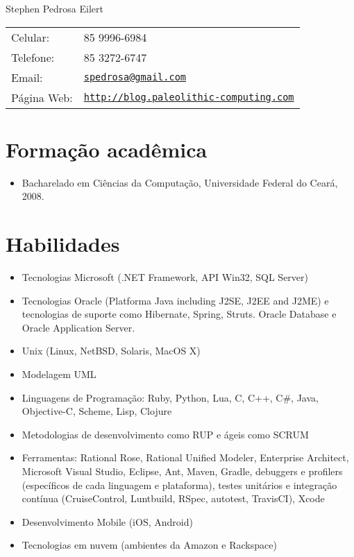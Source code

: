 \documentclass[letterpaper]{article}
\def\name{Stephen Pedrosa Eilert}
\begin{document}
\begin{flushright}

{\huge \name}


\vspace{0.25in}
\begin{minipage}{0.45\linewidth}
  \begin{tabular}{ll}
    Celular: & 85 9996-6984 \\
    Telefone: & 85 3272-6747 \\
    Email: & \href{mailto:spedrosa@gmail.com}{\tt spedrosa@gmail.com} \\
    Página Web: & \href{http://blog.paleolithic-computing.com}{\tt http://blog.paleolithic-computing.com} \\
  \end{tabular}
\end{minipage}
\end{flushright}

\section*{Formação acadêmica}

\begin{itemize}
  \item Bacharelado em Ciências da Computação, Universidade Federal do Ceará, 2008.
\end{itemize}

\section*{Habilidades}
\begin{itemize}
  \item Tecnologias Microsoft (.NET Framework, API Win32, SQL Server)
  \item Tecnologias Oracle (Platforma Java including J2SE, J2EE and J2ME) e tecnologias
    de suporte como Hibernate, Spring, Struts.
    Oracle Database e Oracle Application Server.
  \item Unix (Linux, NetBSD, Solaris, MacOS X)
  \item Modelagem UML
  \item Linguagens de Programação: Ruby, Python, Lua, C, C++, C\#, Java, Objective-C, Scheme, Lisp, Clojure
  \item Metodologias de desenvolvimento como RUP e ágeis como SCRUM
  \item Ferramentas: Rational Rose, Rational Unified Modeler, Enterprise Architect, Microsoft
Visual Studio, Eclipse, Ant, Maven, Gradle, debuggers e profilers (específicos de cada linguagem e plataforma),
testes unitários e integração contínua (CruiseControl, Luntbuild, RSpec, autotest, TravisCI), Xcode
  \item Desenvolvimento Mobile (iOS, Android)
  \item Tecnologias em nuvem (ambientes da Amazon e Rackspace)
\end{itemize}
\end{document}
